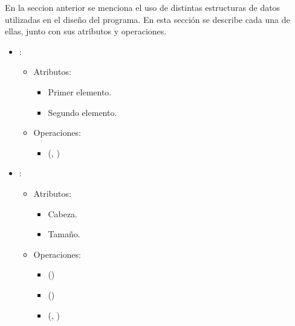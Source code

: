 \documentclass[11pt]{article}
\begin{document}
   En la seccion anterior se menciona el uso de distintas estructuras de datos
   utilizadas en el diseño del programa. En esta sección se describe cada una
   de ellas, junto con sus atributos y operaciones.

   \begin{itemize}
      \item {}:
      \begin{itemize}
         \item Atributos:

         \begin{itemize}
            \item Primer elemento.
            \item Segundo elemento.
         \end{itemize}
      \end{itemize}

      \begin{itemize}
         \item Operaciones:

         \begin{itemize}
            \item {}(, )
         \end{itemize}
      \end{itemize}

      \item {}:

      \begin{itemize}
         \item Atributos:

         \begin{itemize}
            \item Cabeza.
            \item Tamaño.
         \end{itemize}
      \end{itemize}

      \begin{itemize}
         \item Operaciones:

         \begin{itemize}
            \item {}()
            \item {}()
            \item {}(, )
         \end{itemize}
      \end{itemize}


\end{itemize}
\end{document}
